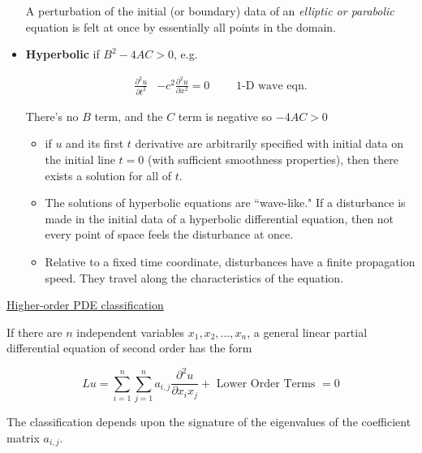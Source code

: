 \documentclass[12pt]{article}
\begin{document}
\begin{itemize}
A perturbation of the initial (or boundary) data of an \textit{elliptic or 
parabolic} equation is felt at once by essentially all points in the domain. 

\item \textbf{Hyperbolic} if $B^2 - 4 AC > 0$, e.g.

\begin{align*}
\frac{\partial^2 u}{\partial t^2} &- c^2\frac{\partial^2 u}{\partial x^2} = 0
\qquad \text{ 1-D wave eqn.} \nonumber
\end{align*}

There's no $B$ term, and the $C$ term is negative so $-4AC > 0$

\begin{itemize}
\item if $u$ and its first $t$ derivative are arbitrarily specified with 
      initial data on the initial line $t= 0$ (with sufficient smoothness 
      properties), then there exists a solution for all of $t$.
\item The solutions of hyperbolic equations are ``wave-like." If a disturbance 
      is made in the initial data of a hyperbolic differential equation, then 
      not every point of space feels the disturbance at once.
\item Relative to a fixed time coordinate, disturbances have a finite 
      propagation speed. They travel along the characteristics of the equation.
\end{itemize}
 
\end{itemize}

\underline{Higher-order PDE classification}

If there are $n$ independent variables $x_1, x_2 , \dots, x_n$, a general 
linear partial differential equation of second order has the form

\begin{equation}
Lu = \sum_{i=1}^n \sum_{j=1}^n a_{i,j} \frac{\partial^2 u}{\partial x_i x_j} + 
\text{ Lower Order Terms } = 0 \nonumber
\end{equation}

The classification depends upon the signature of the eigenvalues of the 
coefficient matrix $a_{i,j}$.
\end{document}
